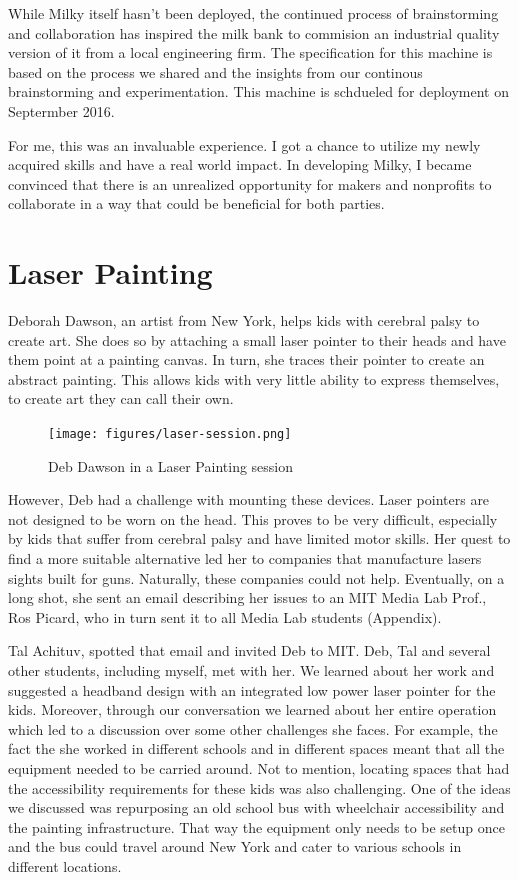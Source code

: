 While Milky itself hasn't been deployed, the continued process of brainstorming and collaboration has inspired the milk bank to commision an industrial quality version of it from a local engineering firm. The specification for this machine is based on the process we shared and the insights from our continous brainstorming and experimentation. This machine is schdueled for deployment on Septermber 2016.

For me, this was an invaluable experience. I got a chance to utilize my newly acquired skills and have a real world impact.  In developing Milky, I became convinced that there is an unrealized opportunity for makers and nonprofits to collaborate in a way that could be beneficial for both parties.

\section{Laser Painting}

Deborah Dawson, an artist from New York, helps kids with cerebral palsy to create art. She does so by attaching a small laser pointer to their heads and have them point at a painting canvas. In turn, she traces their pointer to create an abstract painting. This allows kids with very little ability to express themselves, to create art they can call their own.

   \begin{figure}[thpb]
      \centering
      \texttt{[image: figures/laser-session.png]}
      \caption{Deb Dawson in a Laser Painting session}
      \label{laser-session}
   \end{figure}

However, Deb had a challenge with mounting these devices. Laser pointers are not designed to be worn on the head. This proves to be very difficult, especially by kids that suffer from cerebral palsy and have limited motor skills. Her quest to find a more suitable alternative led her to companies that manufacture lasers sights built for guns. Naturally, these companies could not help. Eventually, on a long shot, she sent an email describing her issues to an MIT Media Lab Prof., Ros Picard, who in turn sent it to all Media Lab students (Appendix). 

Tal Achituv, spotted that email and invited Deb to MIT. Deb, Tal and several other students, including myself, met with her. We learned about her work and suggested a headband design with an integrated low power laser pointer for the kids. Moreover, through our conversation we learned about her entire operation which led to a discussion over some other challenges she faces. For example, the fact the she worked in different schools and in different spaces meant that all the equipment needed to be carried around. Not to mention, locating spaces that had the accessibility requirements for these kids was also challenging. One of the ideas we discussed was repurposing an old school bus with wheelchair accessibility and the painting infrastructure. That way the equipment only needs to be setup once and the bus could travel around New York and cater to various schools in different locations. 

